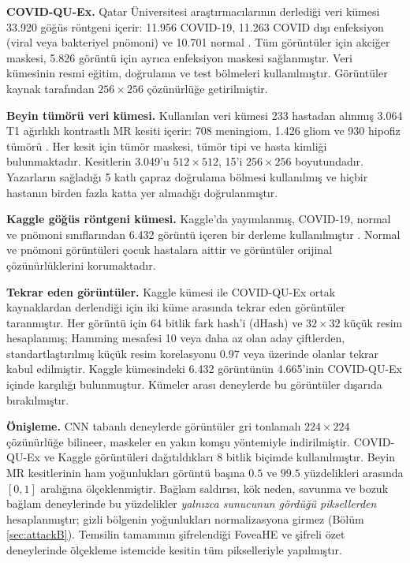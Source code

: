 \textbf{COVID-QU-Ex.} Qatar Üniversitesi araştırmacılarının derlediği veri kümesi 33.920 göğüs röntgeni içerir: 11.956 COVID-19, 11.263 COVID dışı enfeksiyon (viral veya bakteriyel pnömoni) ve 10.701 normal \cite{tahir2021covidquex}. Tüm görüntüler için akciğer maskesi, 5.826 görüntü için ayrıca enfeksiyon maskesi sağlanmıştır. Veri kümesinin resmi eğitim, doğrulama ve test bölmeleri kullanılmıştır. Görüntüler kaynak tarafından $256 \times 256$ çözünürlüğe getirilmiştir.

\textbf{Beyin tümörü veri kümesi.} Kullanılan veri kümesi 233 hastadan alınmış 3.064 T1 ağırlıklı kontrastlı MR kesiti içerir: 708 meningiom, 1.426 gliom ve 930 hipofiz tümörü \cite{cheng2015brain}. Her kesit için tümör maskesi, tümör tipi ve hasta kimliği bulunmaktadır. Kesitlerin 3.049'u $512 \times 512$, 15'i $256 \times 256$ boyutundadır. Yazarların sağladığı 5 katlı çapraz doğrulama bölmesi kullanılmış ve hiçbir hastanın birden fazla katta yer almadığı doğrulanmıştır.

\textbf{Kaggle göğüs röntgeni kümesi.} Kaggle'da yayımlanmış, COVID-19, normal ve pnömoni sınıflarından 6.432 görüntü içeren bir derleme kullanılmıştır \cite{kaggle2020cxr}. Normal ve pnömoni görüntüleri çocuk hastalara aittir ve görüntüler orijinal çözünürlüklerini korumaktadır.

\textbf{Tekrar eden görüntüler.} Kaggle kümesi ile COVID-QU-Ex ortak kaynaklardan derlendiği için iki küme arasında tekrar eden görüntüler taranmıştır. Her görüntü için 64 bitlik fark hash'i (dHash) ve $32 \times 32$ küçük resim hesaplanmış; Hamming mesafesi 10 veya daha az olan aday çiftlerden, standartlaştırılmış küçük resim korelasyonu $0.97$ veya üzerinde olanlar tekrar kabul edilmiştir. Kaggle kümesindeki 6.432 görüntünün 4.665'inin COVID-QU-Ex içinde karşılığı bulunmuştur. Kümeler arası deneylerde bu görüntüler dışarıda bırakılmıştır.

\textbf{Önişleme.} CNN tabanlı deneylerde görüntüler gri tonlamalı $224 \times 224$ çözünürlüğe bilineer, maskeler en yakın komşu yöntemiyle indirilmiştir. COVID-QU-Ex ve Kaggle görüntüleri dağıtıldıkları 8 bitlik biçimde kullanılmıştır. Beyin MR kesitlerinin ham yoğunlukları görüntü başına $0.5$ ve $99.5$ yüzdelikleri arasında $[0, 1]$ aralığına ölçeklenmiştir. Bağlam saldırısı, kök neden, savunma ve bozuk bağlam deneylerinde bu yüzdelikler \emph{yalnızca sunucunun gördüğü piksellerden} hesaplanmıştır; gizli bölgenin yoğunlukları normalizasyona girmez (Bölüm \ref{sec:attackB}). Temsilin tamamının şifrelendiği FoveaHE ve şifreli özet deneylerinde ölçekleme istemcide kesitin tüm pikselleriyle yapılmıştır.

